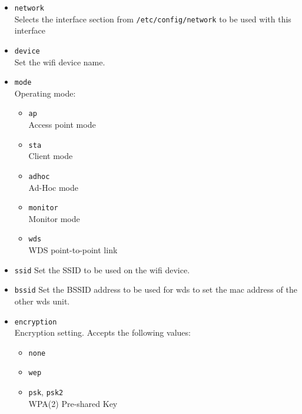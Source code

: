 \begin{itemize}
    \item \texttt{network} \\
        Selects the interface section from \texttt{/etc/config/network} to be
        used with this interface

    \item \texttt{device} \\
	Set the wifi device name.

    \item \texttt{mode} \\
        Operating mode:

        \begin{itemize}
            \item \texttt{ap} \\
                Access point mode

            \item \texttt{sta} \\
                Client mode

            \item \texttt{adhoc} \\
                Ad-Hoc mode

            \item \texttt{monitor} \\
                Monitor mode

            \item \texttt{wds} \\
                WDS point-to-point link

        \end{itemize}

    \item \texttt{ssid}
	Set the SSID to be used on the wifi device.

    \item \texttt{bssid}
	Set the BSSID address to be used for wds to set the mac address of the other wds unit.

    \item \texttt{encryption} \\
        Encryption setting. Accepts the following values:

        \begin{itemize}
	    \item \texttt{none}
	    \item \texttt{wep}
            \item \texttt{psk}, \texttt{psk2} \\
                WPA(2) Pre-shared Key


\end{itemize}
\end{itemize}
